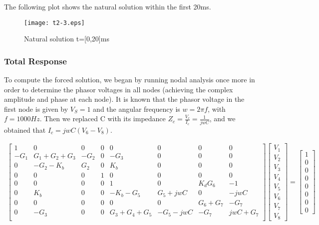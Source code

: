 The following plot shows the natural solution within the first 20ms.
\begin{figure}[h] \centering
\texttt{[image: t2-3.eps]}
\caption{Natural solution t=[0,20]ms}
\label{fig:natural}
\end{figure}

\subsubsection{Total Response}

To compute the forced solution, we began by running nodal analysis once more in order to determine the phasor voltages in all nodes (achieving the complex amplitude and phase at each node). It is known that the phasor voltage in the first node is given by $V_S =1$ and the angular frequency is $w=2\pi f$, with $f=1000Hz$. Then we replaced C with its impedance $Z_c= \frac{V_c}{I_c}=\frac{1}{jwC}$, and we obtained that $I_c=jwC(V_6-V_8)$.

\begin{gather}
\begin{bmatrix}
1 & 0 & 0 & 0 & 0 & 0 & 0 & 0\\
-G_1 & G_1+G_2+G_3 & -G_2& 0 & -G_3 & 0 & 0 & 0\\
0 & -G_2-K_b & G_2 & 0 & K_b & 0 & 0 & 0\\
0 & 0 & 0 & 1 & 0 & 0 & 0 & 0\\
0 & 0 & 0 & 0 & 1 & 0 & K_d G_6 & -1\\
0 & K_b & 0 & 0 & -K_b-G_5 & G_5+jwC & 0 & -jwC\\
0 & 0 & 0 & 0 & 0 & 0 & G_6+G_7 & -G_7\\
0 & -G_3 & 0 & 0 & G_3+G_4+G_5 & -G_5-jwC & -G_7 & jwC+G_7\\
\end{bmatrix}
\begin{bmatrix}
 V_1\\
 V_2\\
 V_3\\
 V_4\\
 V_5\\
 V_6\\
 V_7\\
 V_8
\end{bmatrix}
=
\begin{bmatrix}
 1\\
 0\\
 0\\
 0\\
 0\\
 0\\
 0\\
 0
\end{bmatrix}
\end{gather}


